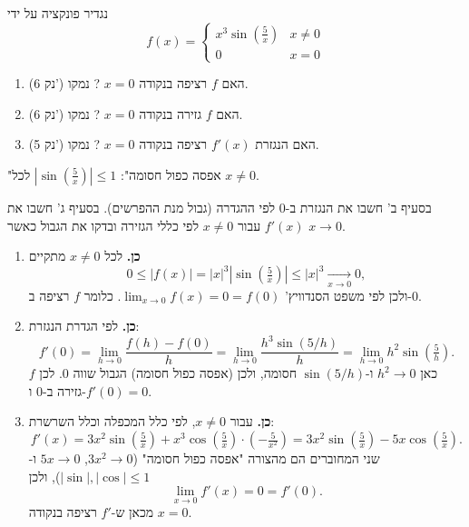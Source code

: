 
\begin{question}
נגדיר פונקציה על ידי
\[ f(x)=\begin{cases} x^3 \sin(\frac{5}{x}) & x\neq 0\\ 0 & x=0 \end{cases} \]
\begin{enumerate}
  \item (6 נק') האם $f$ רציפה בנקודה $x=0$ ? נמקו.
  \item (6 נק') האם $f$ גזירה בנקודה $x=0$ ? נמקו.
  \item (5 נק') האם הנגזרת $f'(x)$ רציפה בנקודה $x=0$ ? נמקו.
\end{enumerate}
\end{question}

\begin{hint}
"אפסה כפול חסומה": $\left|\sin(\frac{5}{x})\right|\le 1$ לכל $x\neq 0$.
\end{hint}

\begin{hint}
בסעיף ב' חשבו את הנגזרת ב-$0$ לפי ההגדרה (גבול מנת ההפרשים). בסעיף ג' חשבו את $f'(x)$ עבור $x\neq0$ לפי כללי הגזירה ובדקו את הגבול כאשר $x\to 0$.
\end{hint}

\begin{solution}
\begin{enumerate}
  \item \textbf{כן.} לכל $x\neq 0$ מתקיים
  \[ 0\le |f(x)| = |x|^3\left|\sin\left(\tfrac{5}{x}\right)\right| \le |x|^3 \xrightarrow[x\to0]{} 0, \]
  ולכן לפי משפט הסנדוויץ' $\lim_{x\to0} f(x)=0=f(0)$. כלומר $f$ רציפה ב-$0$.
  \item \textbf{כן.} לפי הגדרת הנגזרת:
  \[ f'(0)=\lim_{h\to0}\frac{f(h)-f(0)}{h}=\lim_{h\to0}\frac{h^3\sin(5/h)}{h}=\lim_{h\to0} h^2\sin\left(\tfrac{5}{h}\right). \]
  כאן $h^2\to0$ ו-$\sin(5/h)$ חסומה, ולכן (אפסה כפול חסומה) הגבול שווה $0$. לכן $f$ גזירה ב-$0$ ו-$f'(0)=0$.
  \item \textbf{כן.} עבור $x\neq0$, לפי כלל המכפלה וכלל השרשרת:
  \[ f'(x)=3x^2\sin\left(\tfrac{5}{x}\right)+x^3\cos\left(\tfrac{5}{x}\right)\cdot\left(-\tfrac{5}{x^2}\right)=3x^2\sin\left(\tfrac{5}{x}\right)-5x\cos\left(\tfrac{5}{x}\right). \]
  שני המחוברים הם מהצורה "אפסה כפול חסומה" ($3x^2\to0$, $5x\to0$ ו-$|\sin|,|\cos|\le1$), ולכן
  \[ \lim_{x\to0}f'(x)=0=f'(0). \]
  מכאן ש-$f'$ רציפה בנקודה $x=0$.
\end{enumerate}
\end{solution}

